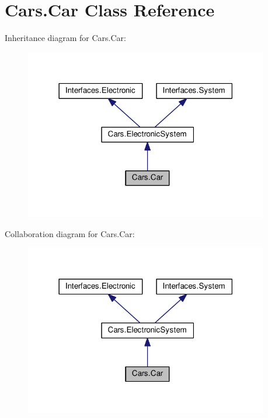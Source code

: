 \hypertarget{classCars_1_1Car}{}\section{Cars.\+Car Class Reference}
\label{classCars_1_1Car}


Inheritance diagram for Cars.\+Car\+:\nopagebreak
\begin{figure}[H]
\begin{center}
\leavevmode
\includegraphics[width=302pt]{classCars_1_1Car__inherit__graph}
\end{center}
\end{figure}


Collaboration diagram for Cars.\+Car\+:\nopagebreak
\begin{figure}[H]
\begin{center}
\leavevmode
\includegraphics[width=302pt]{classCars_1_1Car__coll__graph}
\end{center}
\end{figure}
